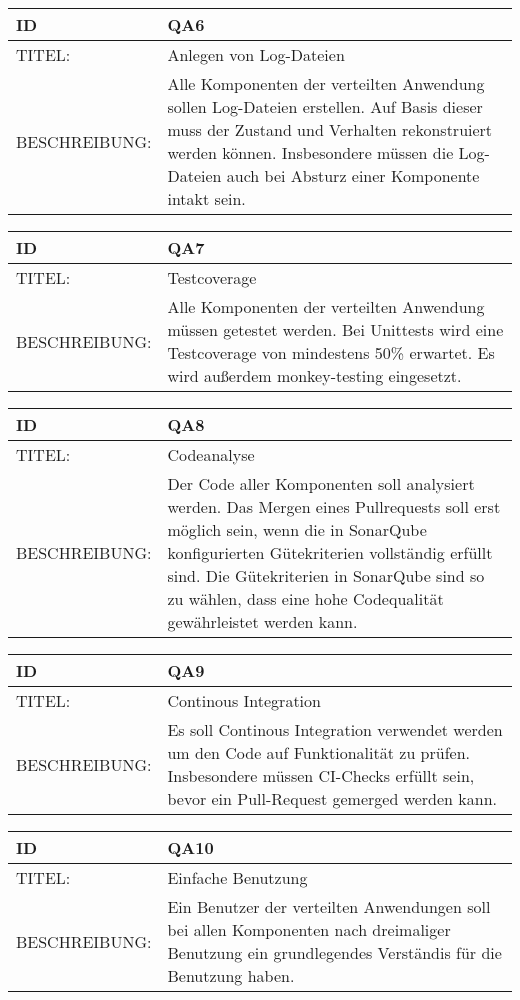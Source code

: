 \begin{tabularx}{16cm}{l|X}
	 \textbf{ID} & \textbf{QA6} \\
	 \hline
		TITEL: & Anlegen von Log-Dateien\\ 
	 \hline 
	 BESCHREIBUNG: & Alle Komponenten der verteilten Anwendung sollen Log-Dateien erstellen. Auf Basis dieser muss der Zustand und Verhalten rekonstruiert werden können. Insbesondere müssen die Log-Dateien auch bei Absturz einer Komponente intakt sein. 
\end{tabularx} 


\begin{tabularx}{16cm}{l|X}
	 \textbf{ID} & \textbf{QA7} \\
	 \hline
		TITEL: & Testcoverage\\ 
	 \hline 
	 BESCHREIBUNG: & Alle Komponenten der verteilten Anwendung müssen getestet werden. Bei Unittests wird eine Testcoverage von mindestens 50\% erwartet. Es wird außerdem monkey-testing eingesetzt. 
\end{tabularx} 



\begin{tabularx}{16cm}{l|X}
	 \textbf{ID} & \textbf{QA8} \\
	 \hline
		TITEL: & Codeanalyse\\ 
	 \hline 
	 BESCHREIBUNG: & Der Code aller Komponenten soll analysiert werden. Das Mergen eines Pullrequests soll erst möglich sein, wenn die in SonarQube konfigurierten Gütekriterien vollständig erfüllt sind. Die Gütekriterien in SonarQube sind so zu wählen, dass eine hohe Codequalität gewährleistet werden kann. 
\end{tabularx} 


\begin{tabularx}{16cm}{l|X}
	 \textbf{ID} & \textbf{QA9} \\
	 \hline
		TITEL: & Continous Integration\\ 
	 \hline 
	 BESCHREIBUNG: & Es soll Continous Integration verwendet werden um den Code auf Funktionalität zu prüfen. Insbesondere müssen CI-Checks erfüllt sein, bevor ein Pull-Request gemerged werden kann.
\end{tabularx} 


\begin{tabularx}{16cm}{l|X}
	 \textbf{ID} & \textbf{QA10} \\
	 \hline
		TITEL: & Einfache Benutzung\\ 
	 \hline 
	 BESCHREIBUNG: & Ein Benutzer der verteilten Anwendungen soll bei allen Komponenten nach dreimaliger Benutzung ein grundlegendes Verständis für die Benutzung haben. 
\end{tabularx} 

